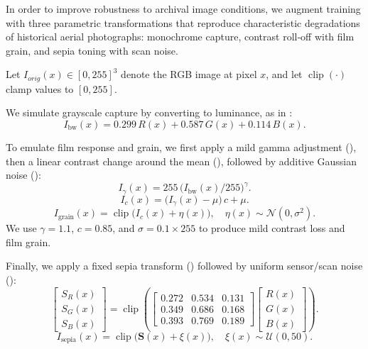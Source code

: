 In order to improve robustness to archival image conditions, we augment training with three parametric transformations that reproduce characteristic degradations of historical aerial photographs: monochrome capture, contrast roll‑off with film grain, and sepia toning with scan noise. 

Let $I_{orig}(x)\in[0,255]^3$ denote the RGB image at pixel $x$, and let $\operatorname{clip}(\cdot)$ clamp values to $[0,255]$.

We simulate grayscale capture by converting to luminance, as in :
\begin{equation}
I_{\text{bw}}(x) = 0.299\,R(x) + 0.587\,G(x) + 0.114\,B(x).
\label{eq:gray}
\end{equation}

To emulate film response and grain, we first apply a mild gamma adjustment (), then a linear contrast change around the mean (), followed by additive Gaussian noise ():
\begin{equation}
I_{\gamma}(x) = 255\,\big(I_{\text{bw}}(x)/255\big)^{\gamma}.
\label{eq:gamma}
\end{equation}
\begin{equation}
I_{c}(x) = \big(I_{\gamma}(x) - \mu\big)\,c + \mu.
\label{eq:contrast}
\end{equation}
\begin{equation}
I_{\text{grain}}(x) = \operatorname{clip}\big(I_{c}(x) + \eta(x)\big),\quad \eta(x)\sim\mathcal{N}(0,\sigma^2).
\label{eq:grain}
\end{equation}
We use $\gamma=1.1$, $c=0.85$, and $\sigma=0.1\times 255$ to produce mild contrast loss and film grain.

Finally, we apply a fixed sepia transform () followed by uniform sensor/scan noise ():
\begin{equation}
\begin{bmatrix} S_R(x) \\ S_G(x) \\ S_B(x) \end{bmatrix}
= \operatorname{clip}\left(
\begin{bmatrix}
0.272 & 0.534 & 0.131 \\
0.349 & 0.686 & 0.168 \\
0.393 & 0.769 & 0.189
\end{bmatrix}
\begin{bmatrix} R(x) \\ G(x) \\ B(x) \end{bmatrix}
\right).
\label{eq:sepia}
\end{equation}
\begin{equation}
I_{\text{sepia}}(x) = \operatorname{clip}\big(\mathbf{S}(x) + \xi(x)\big),\quad \xi(x)\sim\mathcal{U}(0,50).
\label{eq:sepia_noise}
\end{equation}


